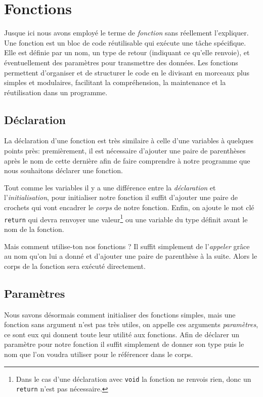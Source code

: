 \chapter{Fonctions}
Jusque ici nous avons employé le terme de \emph{fonction} sans réellement l'expliquer. Une fonction est un bloc de code réutilisable qui exécute une tâche spécifique. Elle est définie par un nom, un type de retour (indiquant ce qu’elle renvoie), et éventuellement des paramètres pour transmettre des données. Les fonctions permettent d’organiser et de structurer le code en le divisant en morceaux plus simples et modulaires, facilitant la compréhension, la maintenance et la réutilisation dans un programme.

\section{Déclaration}
La déclaration d'une fonction est très similaire à celle d'une variables à quelques points près: premièrement, il est nécessaire d'ajouter une paire de parenthèses après le nom de cette dernière afin de faire comprendre à notre programme que nous souhaitons déclarer une fonction.



Tout comme les variables il y a une différence entre la \emph{déclaration} et l'\emph{initialisation}, pour initialiser notre fonction il suffit d'ajouter une paire de crochets qui vont encadrer le \emph{corps} de notre fonction. Enfin, on ajoute le mot clé \lstinline|return| qui devra renvoyer une valeur\footnote{Dans le cas d'une déclaration avec \lstinline|void| la fonction ne renvois rien, donc un \lstinline|return| n'est pas nécessaire.} ou une variable du type définit avant le nom de la fonction.



Mais comment utilise-ton nos fonctions ? Il suffit simplement de l'\emph{appeler} grâce au nom qu'on lui a donné et d'ajouter une paire de parenthèse à la suite. Alors le corps de la fonction sera exécuté directement. 



\section{Paramètres}
Nous savons désormais comment initialiser des fonctions simples, mais une fonction sans argument n'est pas très utiles, on appelle ces arguments \emph{paramètres}, ce sont eux qui donnent toute leur utilité aux fonctions. Afin de déclarer un paramètre pour notre fonction il suffit simplement de donner son type puis le nom que l'on voudra utiliser pour le référencer dans le corps. 

